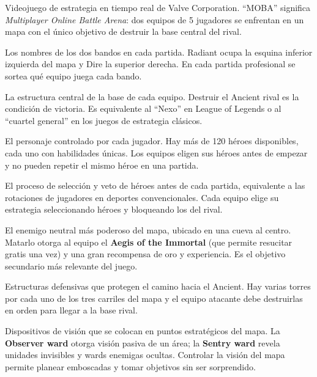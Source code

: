 \documentclass[12pt,a4paper]{article}
\begin{document}
\begin{description}[leftmargin=3.8cm, style=nextline, itemsep=5pt]

  \item[Dota 2 (MOBA)] Videojuego de estrategia en tiempo real de Valve
    Corporation. ``MOBA'' significa \textit{Multiplayer Online Battle Arena}:
    dos equipos de 5 jugadores se enfrentan en un mapa con el \'unico objetivo
    de destruir la base central del rival.

  \item[Radiant y Dire] Los nombres de los dos bandos en cada partida.
    Radiant ocupa la esquina inferior izquierda del mapa y Dire la superior
    derecha. En cada partida profesional se sortea qu\'e equipo juega cada bando.

  \item[Ancient] La estructura central de la base de cada equipo.
    Destruir el Ancient rival es la condici\'on de victoria. Es equivalente
    al ``Nexo'' en League of Legends o al ``cuartel general'' en los juegos
    de estrategia cl\'asicos.

  \item[H\'eroe] El personaje controlado por cada jugador. Hay m\'as de
    120 h\'eroes disponibles, cada uno con habilidades \'unicas. Los equipos
    eligen sus h\'eroes antes de empezar y no pueden repetir el mismo h\'eroe
    en una partida.

  \item[Draft / Drafting] El proceso de selecci\'on y veto de h\'eroes antes
    de cada partida, equivalente a las rotaciones de jugadores en deportes
    convencionales. Cada equipo elige su estrategia seleccionando h\'eroes
    y bloqueando los del rival.

  \item[Roshan] El enemigo neutral m\'as poderoso del mapa, ubicado en una
    cueva al centro. Matarlo otorga al equipo el \textbf{Aegis of the Immortal}
    (que permite resucitar gratis una vez) y una gran recompensa de oro y
    experiencia. Es el objetivo secundario m\'as relevante del juego.

  \item[Torres (Towers)] Estructuras defensivas que protegen el camino hacia el
    Ancient. Hay varias torres por cada uno de los tres carriles del mapa y
    el equipo atacante debe destruirlas en orden para llegar a la base rival.

  \item[Ward (Observer / Sentry)] Dispositivos de visi\'on que se colocan en
    puntos estrat\'egicos del mapa. La \textbf{Observer ward} otorga visi\'on
    pasiva de un \'area; la \textbf{Sentry ward} revela unidades invisibles y
    wards enemigas ocultas. Controlar la visi\'on del mapa permite planear
    emboscadas y tomar objetivos sin ser sorprendido.


\end{description}
\end{document}
